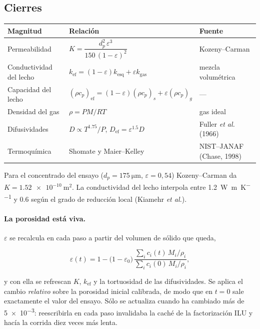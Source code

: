 \subsection{Cierres}

\begin{table}[H]
\centering\small
\begin{tabular}{lll}
\toprule
\textbf{Magnitud} & \textbf{Relación} & \textbf{Fuente} \\
\midrule
Permeabilidad & $K = \dfrac{d_p^{2}\,\varepsilon^{3}}{150\,(1-\varepsilon)^{2}}$ & Kozeny--Carman \\[7pt]
Conductividad del lecho & $k_{\mathrm{ef}} = (1-\varepsilon)k_{\mathrm{esq}} + \varepsilon k_{\mathrm{gas}}$ & mezcla volumétrica \\[3pt]
Capacidad del lecho & $(\rho c_p)_{\mathrm{ef}} = (1-\varepsilon)(\rho c_p)_s + \varepsilon(\rho c_p)_g$ & --- \\[3pt]
Densidad del gas & $\rho = PM/RT$ & gas ideal \\[3pt]
Difusividades & $D \propto T^{1.75}/P$, $D_{\mathrm{ef}} = \varepsilon^{1.5}D$ & Fuller \emph{et al.} (1966) \\[3pt]
Termoquímica & Shomate y Maier--Kelley & NIST--JANAF (Chase, 1998) \\
\bottomrule
\end{tabular}
\end{table}

\noindent
Para el concentrado del ensayo ($d_p = \SI{175}{\micro\meter}$,
$\varepsilon = 0{,}54$) Kozeny--Carman da $K = \SI{1.52e-10}{\meter\squared}$.
La conductividad del lecho interpola entre \qty{1.2}{\watt\per\meter\per\kelvin}
y \qty{0.6}{} según el grado de reducción local (Kiamehr \emph{et al.}).

\paragraph{La porosidad está viva.} $\varepsilon$ se recalcula en cada paso a
partir del volumen de sólido que queda,

\begin{equation}
\varepsilon(t) = 1 - \big(1-\varepsilon_0\big)\,
\frac{\sum_i c_i(t)\,M_i/\rho_i}{\sum_i c_i(0)\,M_i/\rho_i},
\end{equation}

y con ella se refrescan $K$, $k_{\mathrm{ef}}$ y la tortuosidad de las
difusividades. Se aplica el cambio \emph{relativo} sobre la porosidad inicial
calibrada, de modo que en $t=0$ sale exactamente el valor del ensayo. Sólo se
actualiza cuando ha cambiado más de \num{5e-3}: reescribirla en cada paso
invalidaba la caché de la factorización ILU y hacía la corrida diez veces más
lenta.

